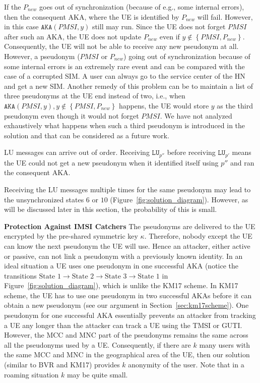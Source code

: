\documentclass{llncs} %
\begin{document}
If the $P_{new}$ goes out of synchronization (because of e.g., some internal errors), then the consequent AKA, where the UE is identified by $P_{new}$ will fail.  However, in this case $\texttt{AKA}(PMSI,y)$ still may run. Since the UE does not forget $PMSI$ after such an AKA, the UE does not update $P_{new}$ even if $y \notin \left\lbrace PMSI,P_{new} \right\rbrace$. Consequently, the UE will not be able to receive any new pseudonym at all. However, a pseudonym ($PMSI$ or $P_{new}$) going out of synchronization because of some internal errors is an extremely rare event and can be compared with the case of a corrupted SIM. A user can always go to the service center of the HN and get a new SIM. Another remedy of this problem can be to maintain a list of three pseudonyms at the UE end instead of two, i.e., when $\texttt{AKA}(PMSI,y), y \notin \left\lbrace PMSI,P_{new} \right\rbrace$ happens, the UE would store $y$ as the third pseudonym even though it would not forget $PMSI$.  We have not analyzed exhaustively what happens when such a third pseudonym is introduced in the solution and that can be considered as a future work.

LU messages can arrive out of order. Receiving $\texttt{LU}_{p''}$ before receiving $\texttt{LU}_{p'}$ means the UE could not get a new pseudonym when it identified itself using $p''$ and ran the consequent AKA. 

Receiving the LU messages multiple times for the same pseudonym may lead to the unsynchronized states $6$ or $10$ (Figure~\ref{fig:solution_diagram}). However, as will be discussed later in this section, the probability of this is small.

\textbf{Protection Against IMSI Catchers} The pseudonyms are delivered to the UE encrypted by the pre-shared symmetric key $\kappa$. Therefore, nobody except the UE can know the next pseudonym the UE will use. Hence an attacker, either active or passive, can not link a pseudonym with a previously known identity. In an ideal situation a UE uses one pseudonym in one successful AKA (notice the transitions $ \text{State~1} \rightarrow \text{State~2} \rightarrow \text{State~3} \rightarrow \text{State~1}$ in Figure~\ref{fig:solution_diagram}), which is unlike the KM17 scheme. In KM17 scheme, the UE has to use one pseudonym in two successful AKAs before it can obtain a new pseudonym (see our argument in Section~\ref{sec:km17scheme}). One pseudonym for one successful AKA essentially prevents an attacker from tracking a UE any longer than the attacker can track a UE using the TMSI or GUTI. However, the MCC and MNC part of the pseudonyms remains the same across all the pseudonyms used by a UE. Consequently, if there are $k$ many users with the same MCC and MNC in the geographical area of the UE, then our solution (similar to BVR and KM17) provides $k$ anonymity of the user. Note that in a roaming situation $k$ may be quite small.
\end{document}
